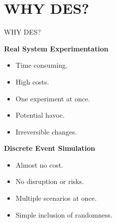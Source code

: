 \section{WHY DES?}
\begin{frame}{WHY DES?}

\begin{multicols}{2}
\textbf{Real System Experimentation}\\
\cite{reynolds2011using}
\columnbreak
\begin{itemize}
    \item Time consuming.
    \item High costs.
    \item One experiment at once.
    \item Potential havoc.
    \item Irreversible changes. %
\end{itemize}
\end{multicols}
\begin{multicols}{2}
\textbf{Discrete Event Simulation}
\columnbreak
\begin{itemize}
    \item Almost no cost.
    \item No disruption or risks.
    \item Multiple scenarios at once.
    \item Simple inclusion of randomness.
\end{itemize}
\end{multicols}
\end{frame}